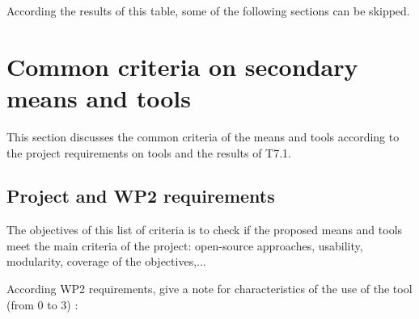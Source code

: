 According the results of this table, some of the following sections can be skipped.

\section{Common criteria on secondary means and tools}
\label{common}
This section discusses the common criteria of the means and tools according to the project requirements on tools and the results of T7.1.

\subsection{Project and WP2 requirements}

The objectives of this list of criteria is to check if the proposed means and tools meet the main criteria of the project: open-source approaches, usability, modularity, coverage of the objectives,...

According WP2 requirements, give a note for characteristics of the use of the tool (from 0 to 3) :


